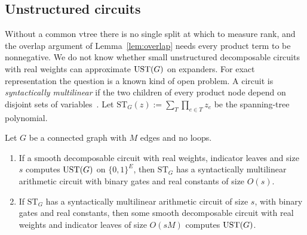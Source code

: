 \subsection{Unstructured circuits}

Without a common vtree there is no single split at which to measure rank, and the overlap argument of Lemma~\ref{lem:overlap} needs every product term to be nonnegative. We do not know whether small unstructured decomposable circuits with real weights can approximate $\mathrm{UST}(G)$ on expanders. For exact representation the question is a known kind of open problem. A circuit is \emph{syntactically multilinear} if the two children of every product node depend on disjoint sets of variables~\cite{RazYehudayoff08}. Let $\mathrm{ST}_G(z):=\sum_{T}\prod_{e\in T}z_e$ be the spanning-tree polynomial.

\begin{proposition}\label{prop:signed-multilinear}
Let $G$ be a connected graph with $M$ edges and no loops.
\begin{enumerate}[label=(\alph*)]
\item If a smooth decomposable circuit with real weights, indicator leaves and size $s$ computes $\mathrm{UST}(G)$ on $\{0,1\}^E$, then $\mathrm{ST}_G$ has a syntactically multilinear arithmetic circuit with binary gates and real constants of size $O(s)$.
\item If $\mathrm{ST}_G$ has a syntactically multilinear arithmetic circuit of size $s$, with binary gates and real constants, then some smooth decomposable circuit with real weights and indicator leaves of size $O(sM)$ computes $\mathrm{UST}(G)$.
\end{enumerate}
\end{proposition}

